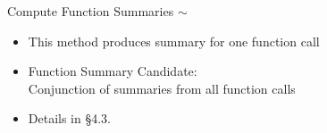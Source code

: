 \begin{frame}{Compute Function Summaries $\sim$}
\begin{itemize}
  \item This method produces summary for one function call
  \item<2-> Function Summary Candidate:\\
            {\color{red}Conjunction} of summaries from all function calls
  \item<2-> Details in \S 4.3.
\end{itemize}

\end{frame}
